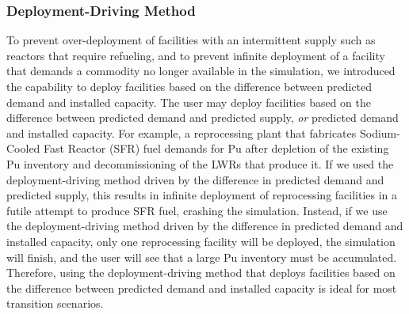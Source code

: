 \subsubsection{Deployment-Driving Method}
\label{sec:ddm}
To prevent over-deployment of facilities with an intermittent 
supply such as reactors that require refueling, and
to prevent infinite deployment of a facility that demands 
a commodity no longer available in the simulation, 
we introduced the capability to deploy facilities 
based on the difference between predicted demand and installed capacity. 
The user may deploy facilities based on the difference 
between predicted demand and predicted supply, \textit{or}
predicted demand and installed capacity. 
For example, a reprocessing plant that fabricates Sodium-Cooled Fast Reactor 
(SFR) fuel demands for Pu after depletion of the existing Pu inventory and 
decommissioning of the \glspl{LWR} that produce it. 
If we used the deployment-driving method driven by 
the difference in predicted demand and predicted supply, this results in 
infinite deployment of reprocessing facilities in a futile attempt 
to produce SFR fuel, crashing the simulation. 
Instead, if we use the deployment-driving method driven by the
difference in predicted demand and installed capacity, only one reprocessing 
facility will be deployed, the simulation will finish, and the user will see that 
a large Pu inventory must be accumulated. 
Therefore, using the deployment-driving method that deploys facilities based on 
the difference between predicted demand and installed capacity is ideal for most 
transition scenarios. 


